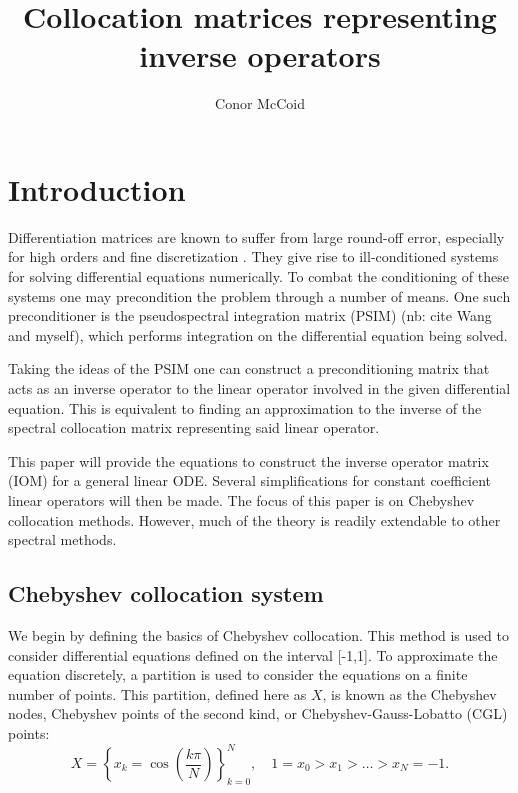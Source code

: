 \documentclass{article}
\title{Collocation matrices representing inverse operators}
\author{Conor McCoid}
\begin{document}
\maketitle

\section{Introduction}


\label{sec:intro}

Differentiation matrices are known to suffer from large round-off error, especially for high orders and fine discretization \cite{BB1999errors}.
They give rise to ill-conditioned systems for solving differential equations numerically.
To combat the conditioning of these systems one may precondition the problem through a number of means.
One such preconditioner is the pseudospectral integration matrix (PSIM) (nb: cite Wang and myself), which performs integration on the differential equation being solved.

Taking the ideas of the PSIM one can construct a preconditioning matrix that acts as an inverse operator to the linear operator involved in the given differential equation.
This is equivalent to finding an approximation to the inverse of the spectral collocation matrix representing said linear operator.

This paper will provide the equations to construct the inverse operator matrix (IOM) for a general linear ODE.
Several simplifications for constant coefficient linear operators will then be made.
The focus of this paper is on Chebyshev collocation methods.
However, much of the theory is readily extendable to other spectral methods.

\subsection{Chebyshev collocation system}

We begin by defining the basics of Chebyshev collocation.
This method is used to consider differential equations defined on the interval [-1,1].
To approximate the equation discretely, a partition is used to consider the equations on a finite number of points.
This partition, defined here as $X$, is known as the Chebyshev nodes, Chebyshev points of the second kind, or Chebyshev-Gauss-Lobatto (CGL) points:
\begin{equation} \label{CGL}
X = \left \{ x_k = \cos \left ( \frac{k \pi}{N} \right ) \right \}_{k=0}^N , \quad 1 = x_0 > x_1 > \dots > x_N = -1.
\end{equation}
\end{document}

